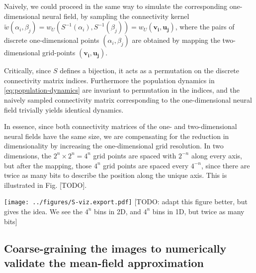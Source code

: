 \documentclass[10pt,letterpaper]{article}
\renewcommand{\vec}[1]{\boldsymbol{#1}}
\begin{document}
Naively, we could proceed in the same way to simulate the corresponding one-dimensional neural field, by sampling the connectivity kernel $\tilde w(\alpha_i, \beta_j) = w_U(S^{-1}(\alpha_i), S^{-1}(\beta_j)) = w_U(\vec{v_i}, \vec{u_j})$, where the pairs of discrete one-dimensional points $(\alpha_i,\beta_j)$ are obtained by mapping the two-dimensional grid-points $(\vec{v_i},\vec{u_j})$.

Critically, since $S$ defines a bijection, it acts as a permutation on the discrete connectivity matrix indices. Furthermore the population dynamics in \autoref{eq:population-dynamics} are invariant to permutation in the indices, and the naively sampled connectivity matrix corresponding to the one-dimensional neural field trivially yields identical dynamics.

In essence, since both connectivity matrices of the one- and two-dimensional neural fields have the same size, we are compensating for the reduction in dimensionality by increasing the one-dimensional grid resolution. In two dimensions, the $2^n \times 2^n = 4^n$ grid points are spaced with $2^{-n}$ along every axis, but after the mapping, those $4^n$ grid points are spaced every $4^{-n}$, since there are twice as many bits to describe the position along the unique axis. This is illustrated in Fig. [TODO].

\texttt{[image: ../figures/S-viz.export.pdf]}
[TODO: adapt this figure better, but gives the idea. We see the $4^n$ bins in 2D, and $4^n$ bins in 1D, but twice as many bits]
\endif



\subsection{Coarse-graining the images to numerically validate the mean-field approximation} \label{sec:coarse-graining}
\end{document}
